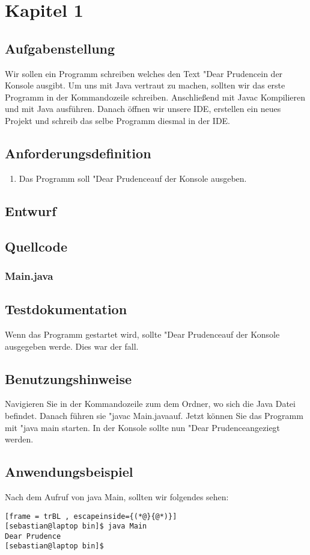 \section{Kapitel 1}
\subsection{Aufgabenstellung}
Wir sollen ein Programm schreiben welches den Text "Dear Prudence\dq \space in der Konsole ausgibt. 
Um uns mit Java vertraut zu machen, sollten wir das erste Programm in der Kommandozeile schreiben.
Anschlie\ss end mit Javac Kompilieren und mit Java ausführen. Danach öffnen wir unsere IDE, erstellen
ein neues Projekt und schreib das selbe Programm diesmal in der IDE.

\subsection{Anforderungsdefinition}
\begin{enumerate}
	\item Das Programm soll "Dear Prudence\dq \space auf der Konsole ausgeben.
\end{enumerate}

\subsection{Entwurf}


\subsection{Quellcode}
\subsubsection{Main.java}


\subsection{Testdokumentation}
Wenn das Programm gestartet wird, sollte "Dear Prudence\dq \space auf der Konsole ausgegeben werde.
Dies war der fall.

\subsection{Benutzungshinweise}
Navigieren Sie in der Kommandozeile zum dem Ordner, wo sich die Java Datei befindet.
Danach führen sie "javac Main.java\dq \space auf. Jetzt können Sie das Programm mit "java main\dq \space
 starten. In der Konsole sollte nun "Dear Prudence\dq \space angeziegt werden.

\subsection{Anwendungsbeispiel}
Nach dem Aufruf von java Main, sollten wir folgendes sehen:
\begin{lstlisting}[frame = trBL , escapeinside={(*@}{@*)}]
[sebastian@laptop bin]$ java Main 
Dear Prudence
[sebastian@laptop bin]$ 
\end{lstlisting}